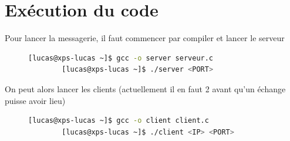 \documentclass[a4paper,12pt]{article}
\begin{document}
\section{Exécution du code}
Pour lancer la messagerie, il faut commencer par compiler et lancer le serveur
\begin{figure}[h]
	\centering
	\vspace{-0.1cm}
	\begin{lstlisting}[language=bash, gobble=4]
		[lucas@xps-lucas ~]$ gcc -o server serveur.c
		[lucas@xps-lucas ~]$ ./server <PORT>
	\end{lstlisting}
\end{figure}

\noindent On peut alors lancer les clients (actuellement il en faut 2 avant qu'un échange puisse avoir lieu)
\begin{figure}[h]
	\centering
	\vspace{-0.2cm}
	\begin{lstlisting}[language=bash, gobble=4]
		[lucas@xps-lucas ~]$ gcc -o client client.c
		[lucas@xps-lucas ~]$ ./client <IP> <PORT>
	\end{lstlisting}
\end{figure}
\end{document}
